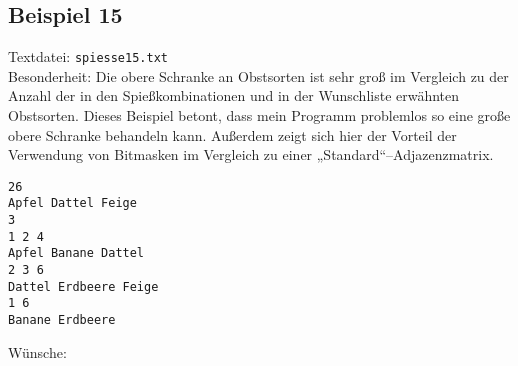 \subsection{Beispiel 15}\label{example:15}
Textdatei: \texttt{spiesse15.txt}\\
Besonderheit: Die obere Schranke an Obstsorten ist sehr groß im Vergleich zu der Anzahl der 
in den Spießkombinationen und in der Wunschliste erwähnten Obstsorten. Dieses Beispiel betont, dass
mein Programm problemlos so eine große obere Schranke behandeln kann. Außerdem zeigt sich hier der
Vorteil der Verwendung von Bitmasken im Vergleich zu einer „Standard“--Adjazenzmatrix.
\begin{verbatim}
26
Apfel Dattel Feige
3
1 2 4
Apfel Banane Dattel
2 3 6
Dattel Erdbeere Feige
1 6
Banane Erdbeere
\end{verbatim}

\noindent
Wünsche: 
\vspace{0.25cm}

\noindent
{}